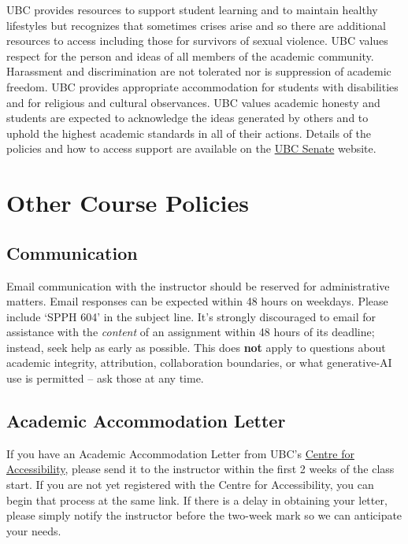 \documentclass[
]{article}
\begin{document}
UBC provides resources to support student learning and to maintain
healthy lifestyles but recognizes that sometimes crises arise and so
there are additional resources to access including those for survivors
of sexual violence. UBC values respect for the person and ideas of all
members of the academic community. Harassment and discrimination are not
tolerated nor is suppression of academic freedom. UBC provides
appropriate accommodation for students with disabilities and for
religious and cultural observances. UBC values academic honesty and
students are expected to acknowledge the ideas generated by others and
to uphold the highest academic standards in all of their actions.
Details of the policies and how to access support are available on the
\href{https://senate.ubc.ca/policies-resources-support-student-success}{UBC
Senate} website.

\section{Other Course Policies}\label{other-course-policies}

\subsection{Communication}\label{communication}

Email communication with the instructor should be reserved for
administrative matters. Email responses can be expected within 48 hours
on weekdays. Please include `SPPH 604' in the subject line. It's
strongly discouraged to email for assistance with the \emph{content} of
an assignment within 48 hours of its deadline; instead, seek help as
early as possible. This does \textbf{not} apply to questions about
academic integrity, attribution, collaboration boundaries, or what
generative-AI use is permitted -- ask those at any time.

\subsection{Academic Accommodation
Letter}\label{academic-accommodation-letter}

If you have an Academic Accommodation Letter from UBC's
\href{https://students.ubc.ca/about-student-services/centre-for-accessibility}{Centre
for Accessibility}, please send it to the instructor within the first 2
weeks of the class start. If you are not yet registered with the Centre
for Accessibility, you can begin that process at the same link. If there
is a delay in obtaining your letter, please simply notify the instructor
before the two-week mark so we can anticipate your needs.
\end{document}
